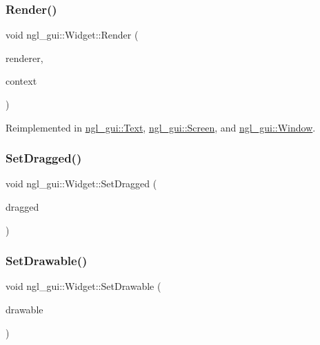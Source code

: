 \subsubsection{\texorpdfstring{Render()}{Render()}}
{\footnotesize\ttfamily void ngl\+\_\+gui\+::\+Widget\+::\+Render (\begin{DoxyParamCaption}\item[{\mbox{\hyperlink{classngl__gui_1_1_g_u_i_renderer}{G\+U\+I\+Renderer}} \&}]{renderer,  }\item[{\mbox{\hyperlink{classngl__gui_1_1_g_u_i_rendering_context}{G\+U\+I\+Rendering\+Context}} \&}]{context }\end{DoxyParamCaption})\hspace{0.3cm}{\ttfamily [virtual]}}



Reimplemented in \mbox{\hyperlink{classngl__gui_1_1_text_aa2dbe996a42ec05d5027ff972028ddf4}{ngl\+\_\+gui\+::\+Text}}, \mbox{\hyperlink{classngl__gui_1_1_screen_ad020aeab5832bc6b4de6e4d6b73534da}{ngl\+\_\+gui\+::\+Screen}}, and \mbox{\hyperlink{classngl__gui_1_1_window_ad79a7c2a639f6bb245540fa8a932f4b1}{ngl\+\_\+gui\+::\+Window}}.

\mbox{\label{classngl__gui_1_1_widget_ada4143b1aeafac782113a27abeab1145}} 
\subsubsection{\texorpdfstring{Set\+Dragged()}{SetDragged()}}
{\footnotesize\ttfamily void ngl\+\_\+gui\+::\+Widget\+::\+Set\+Dragged (\begin{DoxyParamCaption}\item[{const bool}]{dragged }\end{DoxyParamCaption})\hspace{0.3cm}{\ttfamily [virtual]}}

\mbox{\label{classngl__gui_1_1_widget_a9c58db403326c6317b61bc2f32262a3c}} 
\subsubsection{\texorpdfstring{Set\+Drawable()}{SetDrawable()}}
{\footnotesize\ttfamily void ngl\+\_\+gui\+::\+Widget\+::\+Set\+Drawable (\begin{DoxyParamCaption}\item[{\mbox{\hyperlink{classec_1_1_drawable}{ec\+::\+Drawable}} $\ast$}]{drawable }\end{DoxyParamCaption})\hspace{0.3cm}{\ttfamily [virtual]}}

